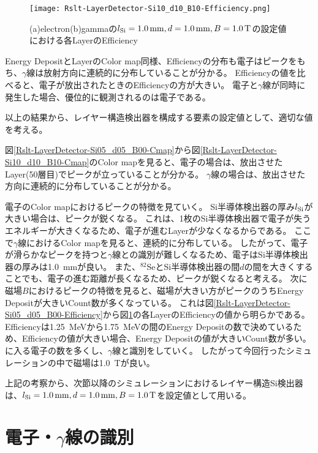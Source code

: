 \documentclass[a4paper,10pt]{jreport}
\begin{document}
\begin{figure}[H]
	\center
	\texttt{[image: Rslt-LayerDetector-Si10\_d10\_B10-Efficiency.png]}
	\caption{(a)electron(b)gammaの$l_{\rm{Si}}=\SI{1.0}{mm}, d=\SI{1.0}{mm}, B=\SI{1.0}{T}$の設定値における各LayerのEfficiency}
	\label{Rslt-LayerDetector-Si10_d10_B10-Efficiency}
\end{figure}

Energy DepositとLayerのColor map同様、Efficiencyの分布も電子はピークをもち、$\gamma$線は放射方向に連続的に分布していることが分かる。
Efficiencyの値を比べると、電子が放出されたときのEfficiencyの方が大きい。
電子と$\gamma$線が同時に発生した場合、優位的に観測されるのは電子である。

以上の結果から、レイヤー構造検出器を構成する要素の設定値として、適切な値を考える。

図\ref{Rslt-LayerDetector-Si05_d05_B00-Cmap}から図\ref{Rslt-LayerDetector-Si10_d10_B10-Cmap}のColor mapを見ると、電子の場合は、放出させたLayer(50層目)でピークが立っていることが分かる。
$\gamma$線の場合は、放出させた方向に連続的に分布していることが分かる。

電子のColor mapにおけるピークの特徴を見ていく。
Si半導体検出器の厚み$l_{\rm{Si}}$が大きい場合は、ピークが鋭くなる。
これは、1枚のSi半導体検出器で電子が失うエネルギーが大きくなるため、電子が進むLayerが少なくなるからである。
ここで$\gamma$線におけるColor mapを見ると、連続的に分布している。
したがって、電子が滑らかなピークを持つと$\gamma$線との識別が難しくなるため、電子はSi半導体検出器の厚みは\SI{1.0}{mm}が良い。
また、$^{82}$SeとSi半導体検出器の間$d$の間を大きくすることでも、電子の進む距離が長くなるため、ピークが鋭くなると考える。
次に磁場$B$におけるピークの特徴を見ると、磁場が大きい方がピークのうちEnergy Depositが大きいCount数が多くなっている。
これは図\ref{Rslt-LayerDetector-Si05_d05_B00-Efficiency}から図\ref{Rslt-LayerDetector-Si10_d10_B10-Efficiency}の各LayerのEfficiencyの値から明らかである。
Efficiencyは\SI{1.25}{MeV}から\SI{1.75}{MeV}の間のEnergy Depositの数で決めているため、Efficiencyの値が大きい場合、Energy Depositの値が大きいCount数が多い。
に入る電子の数を多くし、$\gamma$線と識別をしていく。
したがって今回行ったシミュレーションの中で磁場は\SI{1.0}{T}が良い。

上記の考察から、次節以降のシミュレーションにおけるレイヤー構造Si検出器は、$l_{\rm{Si}}=\SI{1.0}{mm}, d=\SI{1.0}{mm}, B=\SI{1.0}{T}$を設定値として用いる。




\chapter{電子・$\gamma$線の識別}
\end{document}
